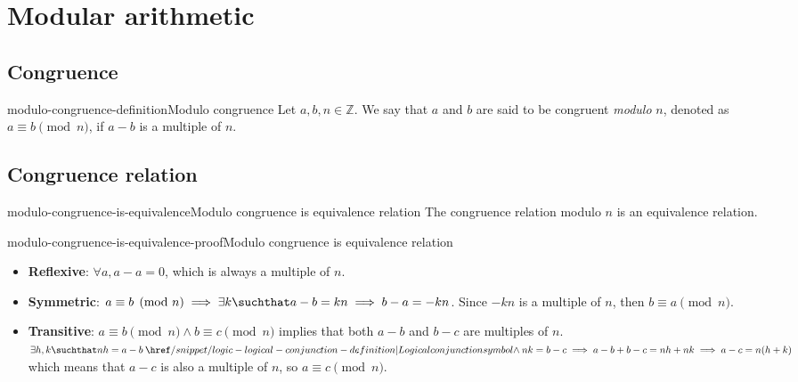 \documentclass[preview]{standalone}
\begin{document}
\genpage

\section{Modular arithmetic}

\subsection{Congruence}

\begin{snippetdefinition}{modulo-congruence-definition}{Modulo congruence}
    Let \(a,b,n\in\mathbb{Z}\).
    We say that \(a\) and \(b\) are said to be congruent \textit{modulo} \(n\),
    denoted as \(a \equiv b \pmod{n}\), if \(a-b\) is a multiple of \(n\).
\end{snippetdefinition}


\subsection{Congruence relation}

\begin{snippetproposition}{modulo-congruence-is-equivalence}{Modulo congruence is equivalence relation}
    The congruence relation modulo \(n\) is an equivalence relation.
\end{snippetproposition}

\begin{snippetproof}{modulo-congruence-is-equivalence-proof}{Modulo congruence is equivalence relation}
    \begin{itemize}
        \item \textbf{Reflexive}: \(\forall a, a-a = 0\), which is always a multiple of \(n\).
        \item \textbf{Symmetric}: \(a \equiv b \pmod{n} \implies \exists k \suchthat a-b=kn \implies b-a=-kn\).
        Since \(-kn\) is a multiple of \(n\), then \(b \equiv a \pmod{n}\).
        \item \textbf{Transitive}: \(a \equiv b \pmod{n} \land b \equiv c \pmod{n}\) implies that both
        \(a-b\) and \(b - c\) are multiples of \(n\).
        \(\exists h, k \suchthat nh=a-b \land nk=b-c \implies a-b+b-c=nh+nk \implies a-c=n(h+k)\)
        which means that \(a-c\) is also a multiple of \(n\), so \(a \equiv c \pmod{n}\).
    \end{itemize}
\end{snippetproof}
\end{document}
